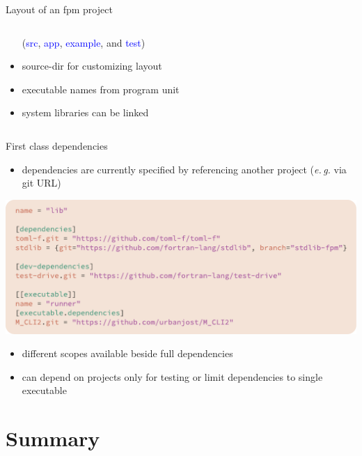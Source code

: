 \documentclass[lualatex,10pt,aspectratio=169]{beamer}
\begin{document}
\begin{frame}{Layout of an fpm project}
\begin{columns}
\begin{column}{.45\textwidth}
\begin{itemize}
               (\textcolor{blue}{src}, \textcolor{blue}{app}, \textcolor{blue}{example}, and \textcolor{blue}{test})
            \item \alert{source-dir} for customizing layout
               \\[2ex]
            \item executable names from \alert{program} unit
               \\[2ex]
            \item system libraries can be linked
               \\[2ex]
         \end{itemize}
      \end{column}
   \end{columns}
\end{frame}

\begin{frame}{First class dependencies}
   \begin{itemize}
      \item dependencies are currently specified by referencing another project
         (\textit{e.\,g.} via git URL)
   \end{itemize}

   \begin{center}
      \includegraphics[width=.85\textwidth]{Figures/dependencies.pdf}
   \end{center}

   \begin{itemize}
      \item different scopes available beside full dependencies
      \item can depend on projects only for testing or limit dependencies to single executable
   \end{itemize}
\end{frame}


\section{Summary}
\end{document}
